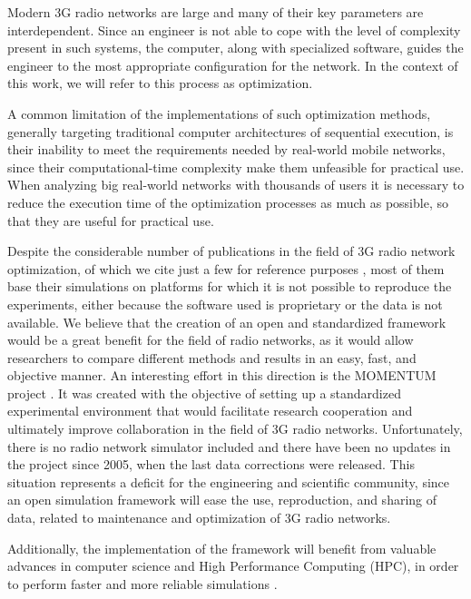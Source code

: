 Modern 3G radio networks are large and many of their key parameters
are interdependent. Since an engineer is not able to cope with the
level of complexity present in such systems, the computer, along with
specialized software, guides the engineer to the most appropriate
configuration for the network. In the context of this work, we will
refer to this process as optimization.

A common limitation of the implementations of such optimization methods,
generally targeting traditional computer architectures of sequential
execution, is their inability to meet the requirements needed by real-world
mobile networks, since their computational-time complexity make them
unfeasible for practical use. When analyzing big real-world networks
with thousands of users it is necessary to reduce the execution time
of the optimization processes as much as possible, so that they are
useful for practical use.

Despite the considerable number of publications in the field of 3G
radio network optimization, of which we cite just a few for reference
purposes \cite{amaldi2007radio_planning,siomina2007minimum_pilot_power,chen2008automated,chen2009fast,gordejuela2009two,siomina2008enhancing},
most of them base their simulations on platforms for which it is not
possible to reproduce the experiments, either because the software
used is proprietary or the data is not available. We believe that
the creation of an open and standardized framework would be a great
benefit for the field of radio networks, as it would allow researchers
to compare different methods and results in an easy, fast, and objective
manner. An interesting effort in this direction is the MOMENTUM project
\cite{momentum2010}. It was created with the objective of setting
up a standardized experimental environment that would facilitate research
cooperation and ultimately improve collaboration in the field of 3G
radio networks. Unfortunately, there is no radio network simulator
included and there have been no updates in the project since 2005,
when the last data corrections were released. This situation represents
a deficit for the engineering and scientific community, since an open
simulation framework will ease the use, reproduction, and sharing
of data, related to maintenance and optimization of 3G radio networks.

Additionally, the implementation of the framework will benefit from
valuable advances in computer science and High Performance Computing
(HPC), in order to perform faster and more reliable simulations \cite{gorder2007multicore,wen2011gpu}.


